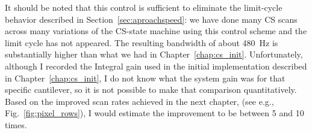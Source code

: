 It should be noted that this control is sufficient to eliminate the limit-cycle behavior described in Section~\ref{sec:aproachspeed}: we have done many CS scans across many variations of the CS-state machine using this control scheme and the limit cycle has not appeared. The resulting bandwidth of about 480~Hz is substantially higher than what we had in Chapter~\ref{chap:cs_init}. Unfortunately, although I recorded the Integral gain used in the initial implementation described in Chapter~\ref{chap:cs_init}, I do not know what the system gain was for that specific cantilever, so it is not possible to make that comparison quantitatively. Based on the improved scan rates achieved in the next chapter,  (see e.g., Fig.~\ref{fig:pixel_rows}), I would estimate the improvement to be between 5 and 10 times.






%   

